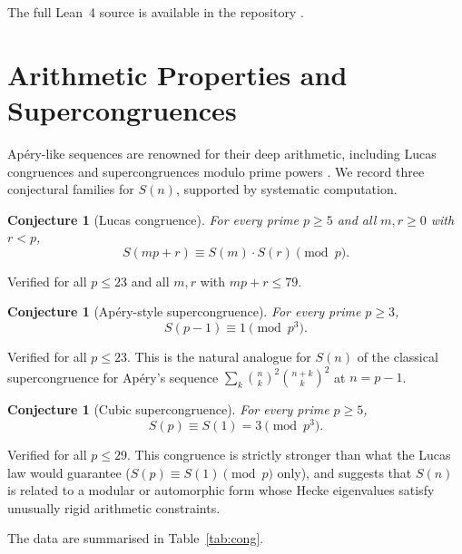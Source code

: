 \documentclass[11pt, a4paper]{article}
\newtheorem{conjecture}[theorem]{Conjecture}
\begin{document}
The full Lean~4 source is available in the repository \cite{repo}.


\section{Arithmetic Properties and Supercongruences}\label{sec:numbertheory}

Ap\'ery-like sequences are renowned for their deep arithmetic, including
Lucas congruences and supercongruences modulo prime powers
\cite{Straub2014,Osburn2016}.  We record three conjectural families for $S(n)$,
supported by systematic computation.

\begin{conjecture}[Lucas congruence]\label{conj:lucas}
For every prime $p\ge 5$ and all $m,r\ge 0$ with $r<p$,
\[
  S(mp+r) \equiv S(m)\cdot S(r) \pmod{p}.
\]
\end{conjecture}

Verified for all $p\le 23$ and all $m,r$ with $mp+r\le 79$.

\begin{conjecture}[Ap\'ery-style supercongruence]\label{conj:apery}
For every prime $p\ge 3$,
\[
  S(p-1) \equiv 1 \pmod{p^3}.
\]
\end{conjecture}

Verified for all $p\le 23$.  This is the natural analogue for $S(n)$ of
the classical supercongruence for Ap\'ery's sequence
$\sum_k\binom{n}{k}^2\binom{n+k}{k}^2$ at $n=p-1$.

\begin{conjecture}[Cubic supercongruence]\label{conj:cubic}
For every prime $p\ge 5$,
\[
  S(p) \equiv S(1) = 3 \pmod{p^3}.
\]
\end{conjecture}

Verified for all $p\le 29$.  This congruence is strictly stronger than
what the Lucas law would guarantee ($S(p)\equiv S(1)\pmod{p}$ only), and
suggests that $S(n)$ is related to a modular or automorphic form whose
Hecke eigenvalues satisfy unusually rigid arithmetic constraints.

\medskip

The data are summarised in Table~\ref{tab:cong}.
\end{document}
